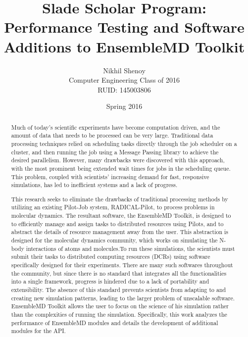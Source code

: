 \documentclass{article}
\begin{document}
\title{Slade Scholar Program: Performance Testing and Software Additions to EnsembleMD Toolkit}
\author{Nikhil Shenoy\\
		Computer Engineering Class of 2016\\
		RUID: 145003806}
\date{Spring 2016}
\maketitle

\begin{abstract}
Much of today's scientific experiments have become computation driven, and the amount of data that needs to be processed can be very large. Traditional data processing techniques relied on scheduling tasks directly through the job scheduler on a cluster, and then running the job using a Message Passing library to achieve the desired parallelism. However, many drawbacks were discovered with this approach, with the most prominent being extended wait times for jobs in the scheduling queue. This problem, coupled with scientists' increasing demand for fast, responsive simulations, has led to inefficient systems and a lack of progress. 

This research seeks to eliminate the drawbacks of traditional processing methods by utilizing an existing Pilot-Job system, RADICAL-Pilot, to process problems in molecular dynamics. The resultant software, the EnsembleMD Toolkit, is designed to to efficiently manage and assign tasks to distributed resources using Pilots, and to abstract the details of resource management away from the user. This abstraction is designed for the molecular dynamics community, which works on simulating the N-body interactions of atoms and molecules.To run these simulations, the scientists must submit their tasks to distributed computing resources (DCRs) using software specifically designed for their experiments. There are many such softwares throughout the community, but since there is no standard that integrates all the functionalities into a single framework, progress is hindered due to a lack of portability and extensibility. The absence of this standard prevents scientists from adapting to and creating new simulation patterns, leading to the larger problem of unscalable software. EnsembleMD Toolkit allows the user to focus on the science of his simulation rather than the complexities of running the simulation. Specifically, this work analyzes the performance of EnsembleMD modules and details the development of additional modules for the API.
\end{abstract}
\end{document}
